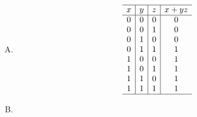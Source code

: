 {{\begin{practices}
\begin{enumerate}[A.]
{\begin{table}[H]
                        \[
                            \begin{array}{c|c|c|c}
                                \hline
                                x & y & z & \bar{x}y \\
                                \hline
                                0 & 0 & 0 & 0 \\
                                0 & 0 & 1 & 0 \\
                                0 & 1 & 0 & 1 \\
                                0 & 1 & 1 & 1 \\
                                1 & 0 & 0 & 0 \\
                                1 & 0 & 1 & 0 \\
                                1 & 1 & 0 & 0 \\
                                1 & 1 & 1 & 0 \\
                                \hline
                            \end{array}
                        \]
                    \end{table}
                }
                \item
                {
                    \begin{table}[H]
                        \centering

                        \[
                            \begin{array}{c|c|c|c}
                                \hline
                                x & y & z & x + yz \\
                                \hline
                                0 & 0 & 0 & 0 \\
                                0 & 0 & 1 & 0 \\
                                0 & 1 & 0 & 0 \\
                                0 & 1 & 1 & 1 \\
                                1 & 0 & 0 & 1 \\
                                1 & 0 & 1 & 1 \\
                                1 & 1 & 0 & 1 \\
                                1 & 1 & 1 & 1 \\
                                \hline
                            \end{array}
                        \]
                    \end{table}
                }
                \item
                {
                    \begin{table}[H]
                        \centering


\end{table}}
\end{enumerate}
\end{practices}}}
